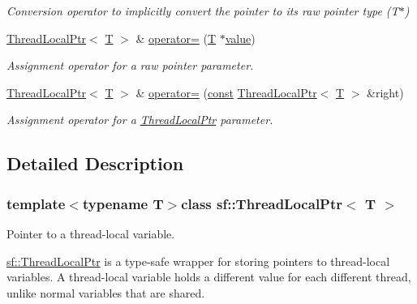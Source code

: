 \begin{DoxyCompactItemize}
\begin{DoxyCompactList}\small\item\em Conversion operator to implicitly convert the pointer to its raw pointer type (T$\ast$) \end{DoxyCompactList}\item 
\hyperlink{classsf_1_1_thread_local_ptr}{Thread\-Local\-Ptr}$<$ \hyperlink{curses_8priv_8h_a5ef253115820acf7d27f3c5c3b02a0f0}{T} $>$ \& \hyperlink{classsf_1_1_thread_local_ptr_a2adfc2e37f437e53acd9d1abd377ef2e}{operator=} (\hyperlink{curses_8priv_8h_a5ef253115820acf7d27f3c5c3b02a0f0}{T} $\ast$\hyperlink{curses_8priv_8h_a3772851912abe3ccbff5c659ff71f2ff}{value})
\begin{DoxyCompactList}\small\item\em Assignment operator for a raw pointer parameter. \end{DoxyCompactList}\item 
\hyperlink{classsf_1_1_thread_local_ptr}{Thread\-Local\-Ptr}$<$ \hyperlink{curses_8priv_8h_a5ef253115820acf7d27f3c5c3b02a0f0}{T} $>$ \& \hyperlink{classsf_1_1_thread_local_ptr_a934db0e5bed32b2d8d0cb02786fb91cf}{operator=} (\hyperlink{term__entry_8h_a57bd63ce7f9a353488880e3de6692d5a}{const} \hyperlink{classsf_1_1_thread_local_ptr}{Thread\-Local\-Ptr}$<$ \hyperlink{curses_8priv_8h_a5ef253115820acf7d27f3c5c3b02a0f0}{T} $>$ \&right)
\begin{DoxyCompactList}\small\item\em Assignment operator for a \hyperlink{classsf_1_1_thread_local_ptr}{Thread\-Local\-Ptr} parameter. \end{DoxyCompactList}\end{DoxyCompactItemize}


\subsection{Detailed Description}
\subsubsection*{template$<$typename T$>$class sf\-::\-Thread\-Local\-Ptr$<$ T $>$}

Pointer to a thread-\/local variable. 

\hyperlink{classsf_1_1_thread_local_ptr}{sf\-::\-Thread\-Local\-Ptr} is a type-\/safe wrapper for storing pointers to thread-\/local variables. A thread-\/local variable holds a different value for each different thread, unlike normal variables that are shared.

